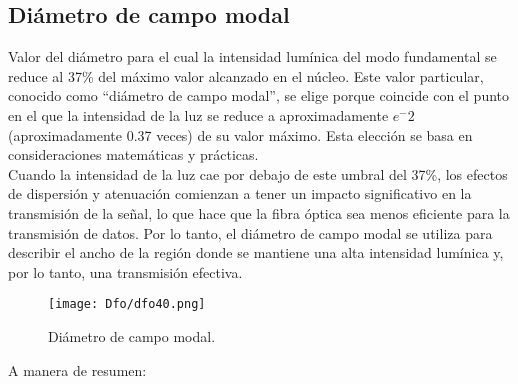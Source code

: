 \documentclass[
	12pt, %
	fleqn, %
	a4paper, %
	oneside, %
]{LegrandOrangeBook}
\begin{document}
\subsection{Diámetro de campo modal}
Valor del diámetro para el cual la intensidad lumínica del modo fundamental se reduce al 37\% del máximo valor alcanzado en el núcleo.  Este valor particular, conocido como ``diámetro de campo modal'', se elige porque coincide con el punto en el que la intensidad de la luz se reduce a aproximadamente $e^-2$ (aproximadamente 0.37 veces) de su valor máximo. Esta elección se basa en consideraciones matemáticas y prácticas.\\
Cuando la intensidad de la luz cae por debajo de este umbral del 37\%, los efectos de dispersión y atenuación comienzan a tener un impacto significativo en la transmisión de la señal, lo que hace que la fibra óptica sea menos eficiente para la transmisión de datos. Por lo tanto, el diámetro de campo modal se utiliza para describir el ancho de la región donde se mantiene una alta intensidad lumínica y, por lo tanto, una transmisión efectiva.
\begin{figure}[H]
\centering
\texttt{[image: Dfo/dfo40.png]}
\caption{Diámetro de campo modal.}
\end{figure}
A manera de resumen:
\end{document}
